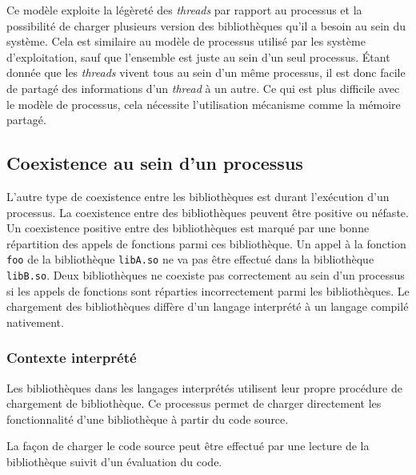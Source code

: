 Ce modèle exploite la légèreté des \textit{threads} par rapport au processus et
la possibilité de charger plusieurs version des bibliothèques qu'il a besoin au sein
du système. Cela est similaire au modèle de processus utilisé par les
système d'exploitation, sauf que l'ensemble est juste au sein d'un seul processus.
Étant donnée que les \textit{threads} vivent tous au sein d'un même processus,
il est donc facile de partagé des informations d'un \textit{thread} à un autre.
Ce qui est plus difficile avec le modèle de processus, cela nécessite l'utilisation
mécanisme comme la mémoire partagé.





\subsection{Coexistence au sein d'un processus}
L'autre type de coexistence entre les bibliothèques est durant l'exécution d'un
processus.  La coexistence entre des bibliothèques peuvent être positive ou
néfaste.  Un coexistence positive entre des bibliothèques est marqué par une
bonne répartition des appels de fonctions parmi ces bibliothèque.  Un appel à
la fonction \verb|foo| de la bibliothèque \verb|libA.so| ne va pas être
effectué dans la bibliothèque \verb|libB.so|. Deux bibliothèques ne coexiste
pas correctement au sein d'un processus si les appels de fonctions sont
réparties incorrectement parmi les bibliothèques. Le chargement des bibliothèques
diffère d'un langage interprété à un langage compilé nativement.

\subsubsection{Contexte interprété}
Les bibliothèques dans les langages interprétés utilisent leur propre procédure
de chargement de bibliothèque. Ce processus permet de charger directement les
fonctionnalité d'une bibliothèque à partir du code source.

La façon de charger le code source peut être effectué par une lecture de la
bibliothèque suivit d'un évaluation du code.

